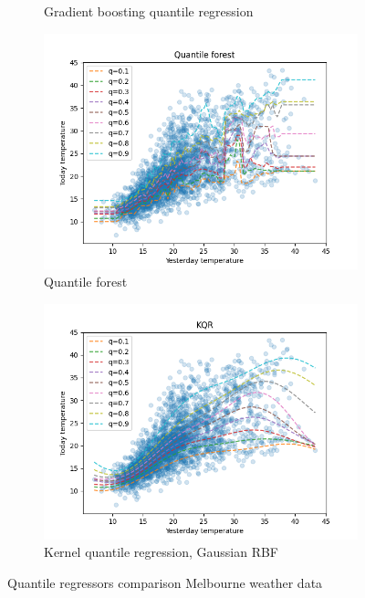 \begin{figure}[!h]
\begin{subfigure}[b]{0.5\linewidth}
      \caption{Gradient boosting quantile regression} 
      \label{fig:melbourne_gradient_boosting_quantile_regression} 
      \vspace{4ex}
    \end{subfigure} 
    \begin{subfigure}[b]{0.5\linewidth}
      \centering
      \includegraphics[width=1.1\textwidth]{images/melbourne_quantile_forest.png} 
      \caption{Quantile forest} 
      \label{fig:melbourne_quantile_forest} 
    \end{subfigure}%
    \begin{subfigure}[b]{0.5\linewidth}
      \centering
      \includegraphics[width=1.1\textwidth]{images/melbourne_gaussian_rbf_kernel_quantile_regression.png}
      \caption{Kernel quantile regression, Gaussian RBF} 
      \label{fig:melborune_kernel_quantile_regression} 
    \end{subfigure} 
    \caption{Quantile regressors comparison Melbourne weather data}
    \label{fig:melbourne_quantiles_comparison} 
  \end{figure}

